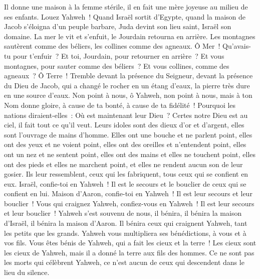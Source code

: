 \begin{multicols}{2}
Il donne une maison à la femme stérile, il en fait une mère joyeuse au milieu de ses enfants. Louez Yahweh~!
\VerseOne{}Quand Israël sortit d'Egypte, quand la maison de Jacob s'éloigna d'un peuple barbare,
Juda devint son lieu saint, Israël son domaine.
La mer le vit et s'enfuit, le Jourdain retourna en arrière.
Les montagnes sautèrent comme des béliers, les collines comme des agneaux.
Ô Mer~! Qu'avais-tu pour t'enfuir~? Et toi, Jourdain, pour retourner en arrière~?
Et vous montagnes, pour sauter comme des béliers~? Et vous collines, comme des agneaux~?
Ô Terre~! Tremble devant la présence du Seigneur, devant la présence du Dieu de Jacob,
qui a changé le rocher en un étang d'eaux, la pierre très dure en une source d'eaux.
\VerseOne{}Non point à nous, ô Yahweh, non point à nous, mais à ton Nom donne gloire, à cause de ta bonté, à cause de ta fidélité~!
Pourquoi les nations diraient-elles~: Où est maintenant leur Dieu~?
Certes notre Dieu est au ciel, il fait tout ce qu'il veut.
Leurs idoles sont des dieux d'or et d'argent, elles sont l'ouvrage de mains d'homme.
Elles ont une bouche et ne parlent point, elles ont des yeux et ne voient point,
elles ont des oreilles et n'entendent point, elles ont un nez et ne sentent point,
elles ont des mains et elles ne touchent point, elles ont des pieds et elles ne marchent point, et elles ne rendent aucun son de leur gosier.
Ils leur ressemblent, ceux qui les fabriquent, tous ceux qui se confient en eux.
Israël, confie-toi en Yahweh~! Il est le secours et le bouclier de ceux qui se confient en lui.
Maison d'Aaron, confie-toi en Yahweh~! Il est leur secours et leur bouclier~!
Vous qui craignez Yahweh, confiez-vous en Yahweh~! Il est leur secours et leur bouclier~!
Yahweh s'est souvenu de nous, il bénira, il bénira la maison d'Israël, il bénira la maison d'Aaron.
Il bénira ceux qui craignent Yahweh, tant les petits que les grands.
Yahweh vous multipliera ses bénédictions, à vous et à vos fils.
Vous êtes bénis de Yahweh, qui a fait les cieux et la terre~!
Les cieux sont les cieux de Yahweh, mais il a donné la terre aux fils des hommes.
Ce ne sont pas les morts qui célèbrent Yahweh, ce n'est aucun de ceux qui descendent dans le lieu du silence.

\end{multicols}
